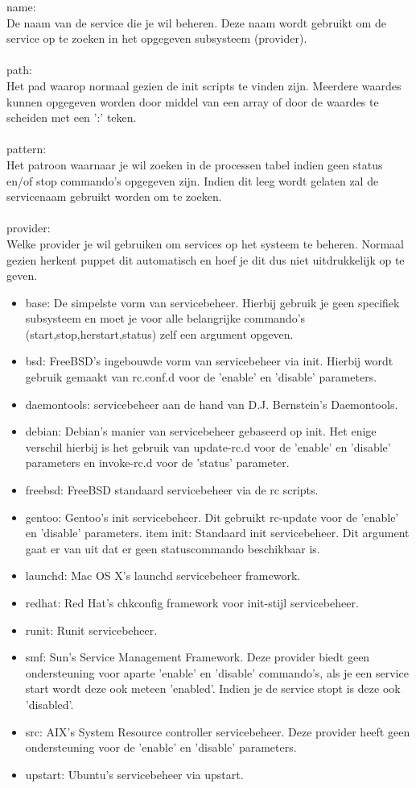 %
name:\\
De naam van de service die je wil beheren. Deze naam wordt gebruikt om de service op te zoeken in het opgegeven subsysteem (provider).\\\\
%
path:\\
Het pad waarop normaal gezien de init scripts te vinden zijn. Meerdere waardes kunnen opgegeven worden door middel van een array of door de waardes te scheiden met een ':' teken.\\\\
%
pattern:\\
Het patroon waarnaar je wil zoeken in de processen tabel indien geen status en/of stop commando's opgegeven zijn. Indien dit leeg wordt gelaten zal de servicenaam gebruikt worden om te zoeken.\\\\
%
provider:\\
Welke provider je wil gebruiken om services op het systeem te beheren. Normaal gezien herkent puppet dit automatisch en hoef je dit dus niet uitdrukkelijk op te geven.
\begin{itemize}
\item base: De simpelste vorm van servicebeheer. Hierbij gebruik je geen specifiek subsysteem en moet je voor alle belangrijke commando's (start,stop,herstart,status) zelf een argument opgeven.
\item bsd: FreeBSD's ingebouwde vorm van servicebeheer via init. Hierbij wordt gebruik gemaakt van rc.conf.d voor de 'enable' en 'disable' parameters.
\item daemontools: servicebeheer aan de hand van D.J. Bernstein's Daemontools.
\item debian: Debian's manier van servicebeheer gebaseerd op init. Het enige verschil hierbij is het gebruik van update-rc.d voor de 'enable' en 'disable' parameters en invoke-rc.d voor de 'status' parameter.
\item freebsd: FreeBSD standaard servicebeheer via de rc scripts.
\item gentoo: Gentoo's init servicebeheer. Dit gebruikt rc-update voor de 'enable' en 'disable' parameters.
item init: Standaard init servicebeheer. Dit argument gaat er van uit dat er geen statuscommando beschikbaar is.
\item launchd: Mac OS X's launchd servicebeheer framework.
\item redhat: Red Hat's chkconfig framework voor init-stijl servicebeheer.
\item runit: Runit servicebeheer.
\item smf: Sun's Service Management Framework. Deze provider biedt geen ondersteuning voor aparte 'enable' en 'disable' commando's, als je een service start wordt deze ook meteen 'enabled'. Indien je de service stopt is deze ook 'disabled'.
\item src: AIX's System Resource controller servicebeheer. Deze provider heeft geen ondersteuning voor de 'enable' en 'disable' parameters.
\item upstart: Ubuntu's servicebeheer via upstart.
\end{itemize}
